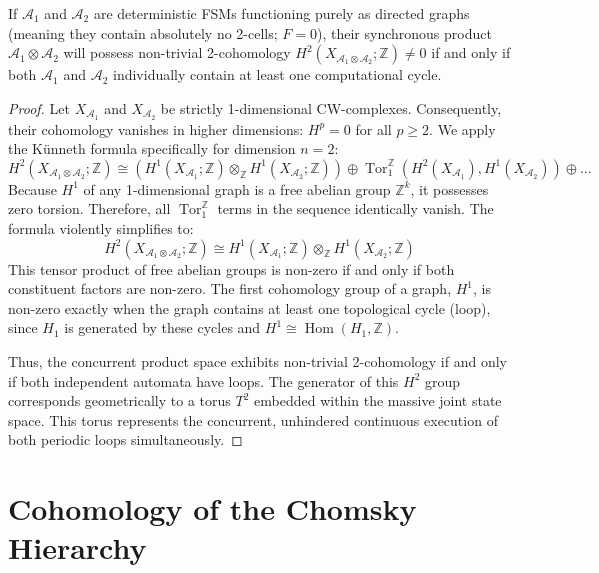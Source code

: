 \begin{lemma}
If $\mathcal{A}_1$ and $\mathcal{A}_2$ are deterministic FSMs functioning purely as directed graphs (meaning they contain absolutely no 2-cells; $F=0$), their synchronous product $\mathcal{A}_1 \otimes \mathcal{A}_2$ will possess non-trivial 2-cohomology $H^2(X_{\mathcal{A}_1 \otimes \mathcal{A}_2}; \mathbb{Z}) \neq 0$ if and only if both $\mathcal{A}_1$ and $\mathcal{A}_2$ individually contain at least one computational cycle.
\end{lemma}
\begin{proof}
Let $X_{\mathcal{A}_1}$ and $X_{\mathcal{A}_2}$ be strictly 1-dimensional CW-complexes. Consequently, their cohomology vanishes in higher dimensions: $H^p = 0$ for all $p \ge 2$.
We apply the Künneth formula specifically for dimension $n=2$:
\[ H^2(X_{\mathcal{A}_1 \otimes \mathcal{A}_2}; \mathbb{Z}) \cong (H^1(X_{\mathcal{A}_1}; \mathbb{Z}) \otimes_\mathbb{Z} H^1(X_{\mathcal{A}_2}; \mathbb{Z})) \oplus \operatorname{Tor}_1^{\mathbb{Z}}(H^2(X_{\mathcal{A}_1}), H^1(X_{\mathcal{A}_2})) \oplus \dots \]
Because $H^1$ of any 1-dimensional graph is a free abelian group $\mathbb{Z}^k$, it possesses zero torsion. Therefore, all $\operatorname{Tor}_1^{\mathbb{Z}}$ terms in the sequence identically vanish.
The formula violently simplifies to:
\[ H^2(X_{\mathcal{A}_1 \otimes \mathcal{A}_2}; \mathbb{Z}) \cong H^1(X_{\mathcal{A}_1}; \mathbb{Z}) \otimes_\mathbb{Z} H^1(X_{\mathcal{A}_2}; \mathbb{Z}) \]
This tensor product of free abelian groups is non-zero if and only if both constituent factors are non-zero. The first cohomology group of a graph, $H^1$, is non-zero exactly when the graph contains at least one topological cycle (loop), since $H_1$ is generated by these cycles and $H^1 \cong \operatorname{Hom}(H_1, \mathbb{Z})$. 

Thus, the concurrent product space exhibits non-trivial 2-cohomology if and only if both independent automata have loops. The generator of this $H^2$ group corresponds geometrically to a torus $T^2$ embedded within the massive joint state space. This torus represents the concurrent, unhindered continuous execution of both periodic loops simultaneously.
\end{proof}

\section{Cohomology of the Chomsky Hierarchy}

